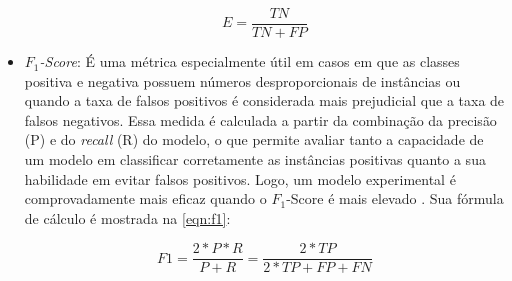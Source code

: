 \begin{itemize}
\begin{equation}
\label{eqn:espec}
E = \frac{TN}{TN + FP}
\end{equation}


\item
\textit{$F_{1}$-Score}: É uma métrica especialmente útil em casos em que as classes positiva e negativa possuem números desproporcionais de instâncias ou quando a taxa de falsos positivos é considerada mais prejudicial que a taxa de falsos negativos.
Essa medida é calculada a partir da combinação da precisão (P) e do \textit{recall} (R) do modelo, o que permite avaliar tanto a capacidade de um modelo em classificar corretamente as instâncias positivas quanto a sua habilidade em evitar falsos positivos.
Logo, um modelo experimental é comprovadamente mais eficaz quando o $F_{1}$-Score é mais elevado \cite{geron2019hands}.
Sua fórmula de cálculo é mostrada na \autoref{eqn:f1}:

\begin{equation}
\label{eqn:f1}
F1 = \frac{2*P*R}{P+R} = \frac{2*TP}{2*TP+FP+FN}
\end{equation}

\end{itemize}